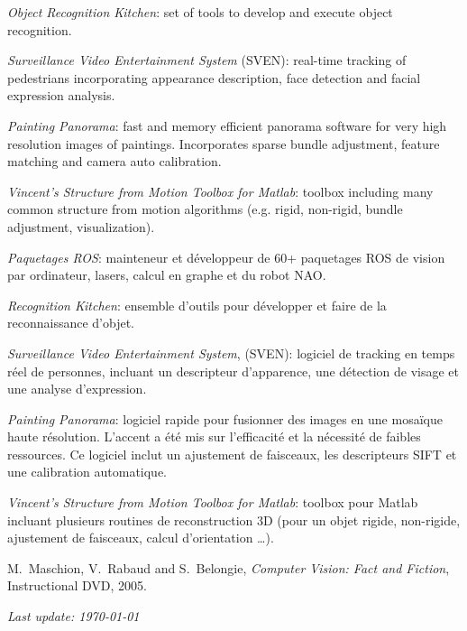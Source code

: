 \documentclass{article}
\begin{document}
\begin{llist}
{{\em Object Recognition Kitchen}: set of tools to develop and execute object recognition.

{\em Surveillance Video Entertainment System} (SVEN): real-time tracking of pedestrians incorporating appearance 
description, face detection and facial expression analysis.

{\em Painting Panorama}: fast and memory efficient panorama software for very high resolution images of paintings. 
Incorporates sparse bundle adjustment, feature matching and camera auto calibration.

{\em Vincent's Structure from Motion Toolbox for Matlab}: toolbox including many common structure from motion algorithms 
(e.g. rigid, non-rigid, bundle adjustment, visualization).
}
{
{\em Paquetages ROS}: mainteneur et d\'{e}veloppeur de 60+ paquetages ROS de vision par ordinateur, lasers, calcul
en graphe et du robot NAO.

{\em Recognition Kitchen}: ensemble d'outils pour d\'{e}velopper et faire de la reconnaissance d'objet.

{\em Surveillance Video Entertainment System}, (SVEN): logiciel de tracking en temps r\'eel de personnes, incluant un 
descripteur d'apparence, une d\'{e}tection de visage et une analyse d'expression.

{\em Painting Panorama}: logiciel rapide pour fusionner des images en une mosa\"{i}que haute r\'{e}solution.  L'accent 
a \'{e}t\'{e} mis sur l'efficacit\'{e} et la n\'{e}cessit\'{e} de faibles ressources.  Ce logiciel inclut un ajustement 
de faisceaux, les descripteurs SIFT et une calibration automatique.

{\em Vincent's Structure from Motion Toolbox for Matlab}: toolbox pour Matlab incluant plusieurs routines de 
reconstruction 3D (pour un objet rigide, non-rigide, ajustement de faisceaux, calcul d'orientation \dots).
}

{
}
{
}


{
}
{
}


M.~Maschion, V.~Rabaud and S.~Belongie, {\em Computer Vision: Fact and Fiction},
Instructional DVD, 2005.





\end{llist}

{\em Last update: \today}
\end{document}

